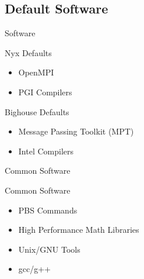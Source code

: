 \documentclass[handout]{beamer}
\begin{document}
  \subsection {Default Software}
  \begin{frame}{Software}
    \begin{block}{Nyx Defaults}
    \begin{itemize}
      \item OpenMPI
      \item PGI Compilers
    \end{itemize}
    \end{block}
    \begin{block}{Bighouse Defaults}
    \begin{itemize}
      \item Message Passing Toolkit (MPT)
      \item Intel Compilers
    \end{itemize}
    \end{block}
  \end{frame}

  \begin{frame}{Common Software}
   \begin{block}{Common Software}
    \begin{itemize}
     \item PBS Commands
     \item High Performance Math Libraries
     \item Unix/GNU Tools
     \item gcc/g++
    \end{itemize}
   \end{block}
  \end{frame}
\end{document}

